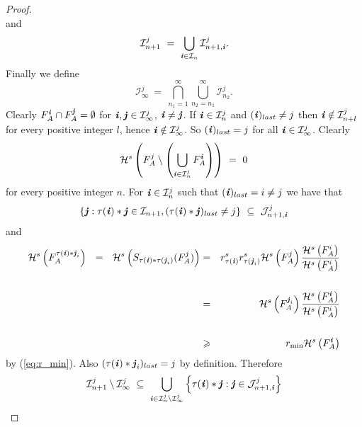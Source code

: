 \documentclass[11pt,english,british]{article}
\numberwithin{equation}{section}
\renewcommand{\geq}{\geqslant}
\begin{document}
\begin{proof}
\[\]
and
\[
\mathcal{I}_{n+1}^{j} \ = \ \bigcup_{\textbf{\emph{i}}\in\mathcal{I}_{n}}\mathcal{I}_{n+1,\textbf{\emph{i}}}^{j}.
\]
%
Finally we define
\[
\mathcal{I}_{\infty}^{j} \ = \ \bigcap_{n_{1}=1}^{\infty}\bigcup_{n_{2}=n_{1}}^{\infty}\mathcal{I}_{n_{2}}^{j}.
\]
Clearly $F_{A}^{\textbf{\emph{i}}}\cap F_{A}^{\textbf{\emph{j}}}=\emptyset$
for $\textbf{\emph{i}},\textbf{\emph{j}}\in\mathcal{I}_{\infty}^{j}$,
$\textbf{\emph{i}}\neq\textbf{\emph{j}}$. If $\textbf{\emph{i}}\in\mathcal{I}_{n}^{j}$
and $(\textbf{\emph{i}})_{last}\neq j$ then $\textbf{\emph{i}}\notin\mathcal{I}_{n+l}^{j}$
for every positive integer $l$, hence $\textbf{\emph{i}}\notin\mathcal{I}_{\infty}^{j}$.
So $(\textbf{\emph{i}})_{last}=j$ for all $\textbf{\emph{i}}\in\mathcal{I}_{\infty}^{j}$.
Clearly
\begin{equation}
\mathcal{H}^{s}\left(F_{A}^{j}\setminus\left(\bigcup_{\textbf{\emph{i}}\in\mathcal{I}_{n}^{j}}F_{A}^{\textbf{\emph{i}}}\right)\right) \ = \ 0\label{eq:Egyenlito lem 1}
\end{equation}
for every positive integer $n$. For $\textbf{\emph{i}}\in\mathcal{I}_{n}^{j}$
such that $(\textbf{\emph{i}})_{last}=i\neq j$ we have that
\[
\left\{ \textbf{\emph{j}}:\tau(\textbf{\emph{i}})*\textbf{\emph{j}}\in\mathcal{I}_{n+1},(\tau(\textbf{\emph{i}})*\textbf{\emph{j}})_{last}\neq j\right\}  \ \subseteq \ \mathcal{J}_{n+1,\textbf{\emph{i}}}^{j}
\]
and
\begin{eqnarray}
\mathcal{H}^{s} \left(F_{A}^{\tau(\textbf{\emph{i}})*\textbf{\emph{j}}_{i}}\right) \ \ =  \ \  \mathcal{H}^{s}\left(S_{\tau(\textbf{\emph{i}})*\tau(\textbf{\emph{j}}_{i})}(F_{A}^{j})\right)&=& r_{\tau(\textbf{\emph{i}})}^{s}r_{\tau(\textbf{\emph{j}}_{i})}^{s}\mathcal{H}^{s}\left(F_{A}^{j}\right)\frac{\mathcal{H}^{s}\left(F_{A}^{i}\right)}{\mathcal{H}^{s}\left(F_{A}^{i}\right)} \nonumber \\ \nonumber \\
&=&\mathcal{H}^{s}\left(F_{A}^{\textbf{\emph{j}}_{i}}\right)\frac{\mathcal{H}^{s}\left(F_{A}^{\textbf{\emph{i}}}\right)}{\mathcal{H}^{s}\left(F_{A}^{i}\right)} \nonumber \\ \nonumber \\
&\geq& r_{\mathrm{\min}}\mathcal{H}^{s}\left(F_{A}^{\textbf{\emph{i}}}\right) \label{lowerestimate1}
\end{eqnarray}
by (\ref{eq:r_min}).  Also $(\tau(\textbf{\emph{i}})*\textbf{\emph{j}}_{i})_{last}=j$ by definition. Therefore
\[
\mathcal{I}_{n+1}^{j}\setminus\mathcal{I}_{\infty}^{j} \ \subseteq \ \bigcup_{\textbf{\emph{i}}\in\mathcal{I}_{n}^{j}\setminus\mathcal{I}_{\infty}^{j}}\left\{ \tau(\textbf{\emph{i}})*\textbf{\emph{j}}:\textbf{\emph{j}}\in\mathcal{J}_{n+1,\textbf{\emph{i}}}^{j}\right\}
\]
\end{proof}
\end{document}
